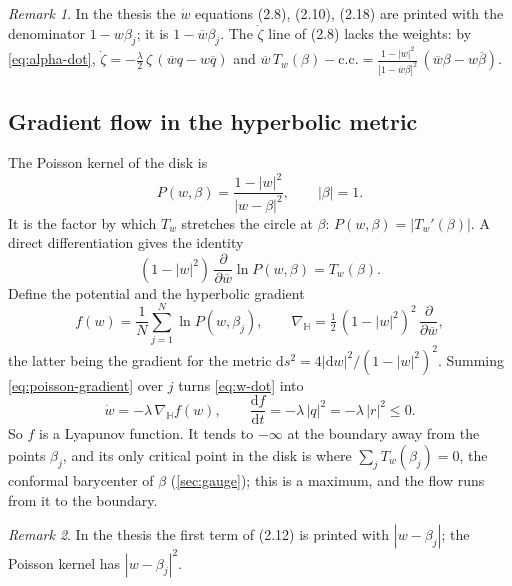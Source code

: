 \documentclass[a4paper,11pt]{article}
\newcommand{\conj}[1]{\overline{#1}}
\newcommand{\T}{T}                       %
\newcommand{\dd}{\mathrm{d}}
\theoremstyle{remark}
\newtheorem{remark}{Remark}
\begin{document}
\begin{remark}
In the thesis the $\dot w$ equations (2.8), (2.10), (2.18) are printed with the
denominator $1-w\beta_j$; it is $1-\conj w\beta_j$. The $\dot\zeta$ line of
(2.8) lacks the weights: by \eqref{eq:alpha-dot},
$\dot\zeta=-\tfrac\lambda2\,\zeta\,(\conj w q-w\conj q)$ and
$\conj w\,\T_w(\beta)-\text{c.c.}
=\frac{1-|w|^2}{|1-\conj w\beta|^2}\,(\conj w\beta-w\conj\beta)$.
\end{remark}

\subsection{Gradient flow in the hyperbolic metric}

The Poisson kernel of the disk is
\begin{equation}\label{eq:poisson}
P(w,\beta)=\frac{1-|w|^2}{|w-\beta|^2},\qquad |\beta|=1 .
\end{equation}
It is the factor by which $\T_w$ stretches the circle at $\beta$:
$P(w,\beta)=|\T_w'(\beta)|$. A direct differentiation gives the identity
\begin{equation}\label{eq:poisson-gradient}
(1-|w|^2)\,\frac{\partial}{\partial\conj w}\ln P(w,\beta)=\T_w(\beta).
\end{equation}
Define the potential and the hyperbolic gradient
\begin{equation}\label{eq:potential-complete}
f(w)=\frac1N\sum_{j=1}^{N}\ln P(w,\beta_j),\qquad
\nabla_{\mathbb H}=\tfrac12\,(1-|w|^2)^2\,\frac{\partial}{\partial\conj w},
\end{equation}
the latter being the gradient for the metric
$\dd s^2=4|\dd w|^2/(1-|w|^2)^2$. Summing \eqref{eq:poisson-gradient} over $j$
turns \eqref{eq:w-dot} into
\begin{equation}\label{eq:gradient-flow}
\dot w=-\lambda\,\nabla_{\mathbb H}f(w),\qquad
\frac{\dd f}{\dd t}=-\lambda\,|q|^2=-\lambda\,|r|^2\le0 .
\end{equation}
So $f$ is a Lyapunov function. It tends to $-\infty$ at the boundary away from
the points $\beta_j$, and its only critical point in the disk is where
$\sum_j\T_w(\beta_j)=0$, the conformal barycenter of $\beta$
(\cref{sec:gauge}); this is a maximum, and the flow runs from it to the
boundary.

\begin{remark}
In the thesis the first term of (2.12) is printed with $|w-\beta_j|$; the
Poisson kernel has $|w-\beta_j|^2$.
\end{remark}
\end{document}
